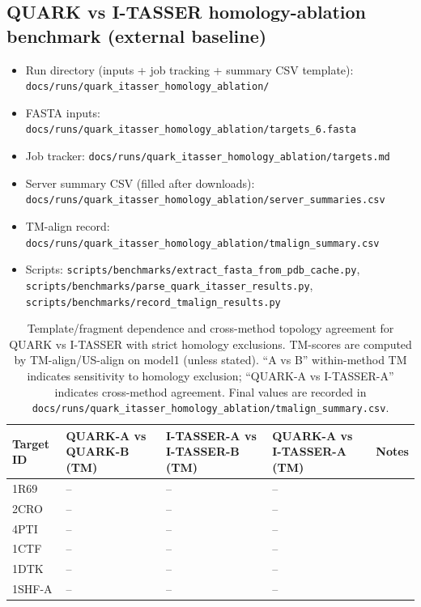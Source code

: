 \subsection*{QUARK vs I-TASSER homology-ablation benchmark (external baseline)}
\begin{itemize}
  \item Run directory (inputs + job tracking + summary CSV template): \texttt{docs/runs/quark\_itasser\_homology\_ablation/}
  \item FASTA inputs: \texttt{docs/runs/quark\_itasser\_homology\_ablation/targets\_6.fasta}
  \item Job tracker: \texttt{docs/runs/quark\_itasser\_homology\_ablation/targets.md}
  \item Server summary CSV (filled after downloads): \texttt{docs/runs/quark\_itasser\_homology\_ablation/server\_summaries.csv}
  \item TM-align record: \texttt{docs/runs/quark\_itasser\_homology\_ablation/tmalign\_summary.csv}
  \item Scripts: \texttt{scripts/benchmarks/extract\_fasta\_from\_pdb\_cache.py}, \texttt{scripts/benchmarks/parse\_quark\_itasser\_results.py}, \texttt{scripts/benchmarks/record\_tmalign\_results.py}
\end{itemize}

\begin{table}[t]
  \centering
  \caption{Template/fragment dependence and cross-method topology agreement for QUARK vs I-TASSER with strict homology exclusions. TM-scores are computed by TM-align/US-align on model1 (unless stated). ``A vs B'' within-method TM indicates sensitivity to homology exclusion; ``QUARK-A vs I-TASSER-A'' indicates cross-method agreement. Final values are recorded in \texttt{docs/runs/quark\_itasser\_homology\_ablation/tmalign\_summary.csv}.}
  \label{tab:quark_itasser_homology_ablation}
  \scriptsize
  \setlength{\tabcolsep}{4pt}
  \begin{tabular}{lllll}
    \toprule
    Target ID & QUARK-A vs QUARK-B (TM) & I-TASSER-A vs I-TASSER-B (TM) & QUARK-A vs I-TASSER-A (TM) & Notes \\
    \midrule
    1R69 & -- & -- & -- &  \\
    2CRO & -- & -- & -- &  \\
    4PTI & -- & -- & -- &  \\
    1CTF & -- & -- & -- &  \\
    1DTK & -- & -- & -- &  \\
    1SHF-A & -- & -- & -- &  \\
    \bottomrule
  \end{tabular}
\end{table}

